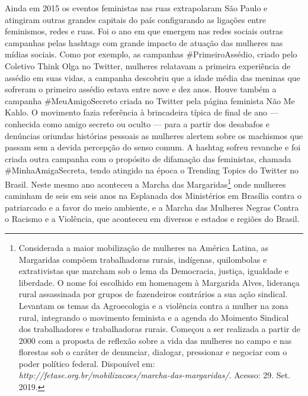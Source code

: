 Ainda em 2015 os eventos feministas nas ruas extrapolaram São Paulo e
atingiram outras grandes capitais do país configurando as ligações entre
feminismos, redes e ruas. Foi o ano em que emergem nas redes sociais
outras campanhas pelas hashtags com grande impacto de atuação das
mulheres nas mídias sociais. Como por exemplo, as campanhas \#PrimeiroAssédio, 
criado pelo Coletivo Think Olga no Twitter, mulheres relatavam
a primeira experiência de assédio em suas vidas, a campanha descobriu
que a idade média das meninas que sofreram o primeiro assédio estava
entre nove e dez anos. Houve também a campanha \#MeuAmigoSecreto criada
no Twitter pela página feminista Não Me Kahlo. O movimento fazia
referência à brincadeira típica de final de ano --- conhecida como amigo
secreto ou oculto --- para a partir dos desabafos e denúncias oriundas
histórias pessoais as mulheres alertem sobre os machismos que passam sem
a devida percepção do senso comum. A hashtag sofreu revanche e foi
criada outra campanha com o propósito de difamação das feministas,
chamada \#MinhaAmigaSecreta, tendo atingido na época o Trending Topics
do Twitter no Brasil. Neste mesmo ano aconteceu a Marcha das
Margaridas\footnote{Considerada a maior mobilização de mulheres na
  América Latina, as Margaridas compõem trabalhadoras rurais, indígenas,
  quilombolas e extrativistas que marcham sob o lema da Democracia,
  justiça, igualdade e liberdade. O nome foi escolhido em homenagem à
  Margarida Alves, liderança rural assassinada por grupos de fazendeiros
  contrários a sua ação sindical. Levantam os temas da Agroecologia e a
  violência contra a mulher na zona rural, integrando o movimento
  feminista e a agenda do Moimento Sindical dos trabalhadores e
  trabalhadoras rurais. Começou a ser realizada a partir de 2000 com a
  proposta de reflexão sobre a vida das mulheres no campo e nas
  florestas sob o caráter de denunciar, dialogar, pressionar e negociar
  com o poder político federal. Disponível em:
  \emph{http://fetase.org.br/mobilizacoes/marcha-das-margaridas/}.
  Acesso: 29. Set. 2019.} onde mulheres caminham de seis em seis anos na
Esplanada dos Ministérios em Brasília contra o patriarcado e a favor do
meio ambiente, e a Marcha das Mulheres Negras Contra o Racismo e a
Violência, que aconteceu em diversos e estados e regiões do Brasil.

